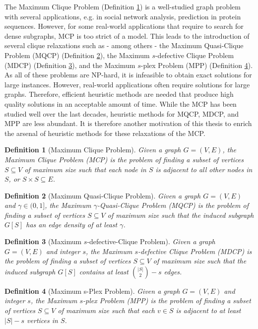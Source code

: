 \documentclass [11pt]{article}
\newtheorem{definition}{Definition}[section]
\begin{document}
The Maximum Clique Problem (Definition \ref{def:mcp}) is a well-studied graph problem with several applications, e.g. in social network analysis, prediction in protein sequences. However, for some real-world applications that require to search for dense subgraphs, MCP is too strict of a model. This leads to the introduction of several clique relaxations such as - among others - the Maximum Quasi-Clique Problem (MQCP) (Definition \ref{def:mqcp}), the Maximum $s$-defective Clique Problem (MDCP) (Definition \ref{def:mdcp}), and the Maximum $s$-plex Problem (MPP) (Definition \ref{def:mpp}). 
As all of these problems are NP-hard, it is infeasible to obtain exact solutions for large instances. However, real-world applications often require solutions for large graphs. Therefore, efficient heuristic methods are needed that produce high quality solutions in an acceptable amount of time. While the MCP has been studied well over the last decades, heuristic methods for MQCP, MDCP, and MPP are less abundant. It is therefore another motivation of this thesis to enrich the arsenal of heuristic methods for these relaxations of the MCP. 


\begin{definition}[Maximum Clique Problem]
	\label{def:mcp}
	Given a graph $G = (V,E)$, the Maximum Clique Problem (MCP) is the problem of finding a subset of vertices $S \subseteq V$ of maximum size 
	such that each node in $S$ is adjacent to all other nodes in $S$, or $S \times S \subseteq E$. 
\end{definition}

\begin{definition}[Maximum Quasi-Clique Problem]
	\label{def:mqcp}
	Given a graph $G = (V,E)$ and $\gamma \in (0,1]$, the Maximum $\gamma$-Quasi-Clique Problem (MQCP) is the problem of finding a subset of vertices $S \subseteq V$ of maximum size 
	such that the induced subgraph $G[S]$ has an edge density of at least $\gamma$. 
\end{definition}

\begin{definition}[Maximum $s$-defective-Clique Problem]
	\label{def:mdcp}
	Given a graph $G = (V,E)$ and integer $s$, the Maximum $s$-defective Clique Problem (MDCP) is the problem of finding a subset of vertices $S \subseteq V$ of maximum size 
	such that the induced subgraph $G[S]$ contains at least ${|S| \choose 2} - s$ edges. 
\end{definition}

\begin{definition}[Maximum s-Plex Problem]
	\label{def:mpp}
	Given a graph $G = (V,E)$ and integer $s$, the Maximum $s$-plex Problem (MPP) is the problem of finding a subset of vertices $S \subseteq V$ of maximum size 
	such that each $v \in S$ is adjacent to at least $|S| - s$ vertices in $S$. 
\end{definition}
\end{document}
